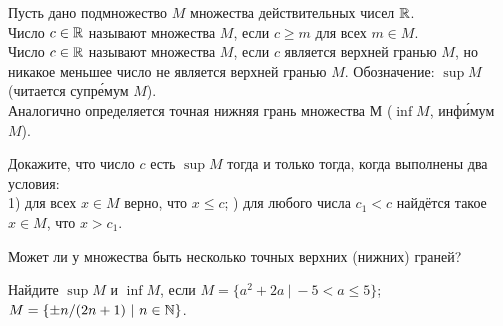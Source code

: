 \documentclass[a4paper, 11pt]{article}
\begin{document}



 Пусть дано подмножество $M$ множества действительных чисел $\mathbb{R}$. \\
Число  $c\in\mathbb{R}$ называют  множества $M$, если $c\geq m$ для всех $m\in M$.\\
Число  $c\in\mathbb{R}$ %
называют  множества $M$,
если $c$ является верхней гранью %
$M$, но никакое меньшее число
не является верхней гранью %
$M$.
Обозначение: $\sup M$ (читается  супр\'емум  %
$M$).\\
Аналогично определяется точная нижняя грань множества $М$ ($\inf M$,  инф\'имум $M$).






Докажите, что число $c$ есть $\sup M$ тогда и только тогда, когда
выполнены два условия:\\
1) для всех $x\in M$ верно, что $x\leq c$; ) для любого числа $c_1<c$ найд\"ется такое $x\in M$, что $x>c_1$.


 Может ли у множества быть несколько точных верхних
(нижних) граней?

Найдите $\sup M$ и $\inf M$, если
$M=\{a^2+2a\ |\  -5<a\leq 5\}$;
$\displaystyle{M=\{\pm n/(2n+1)\ |\ n\in\N\}}$.
\end{document}
